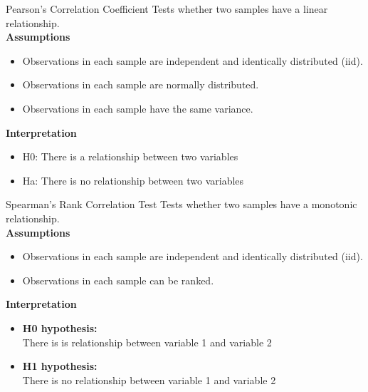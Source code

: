 \begin{frame}[t]{Pearson’s Correlation Coefficient}
	Tests whether two samples have a linear relationship. \\
	\textbf{Assumptions}
	\begin{itemize}
		\item Observations in each sample are independent and identically distributed (iid).
		\item Observations in each sample are normally distributed.
		\item Observations in each sample have the same variance.
	\end{itemize}

	\textbf{Interpretation}
\begin{itemize}
	\item H0: There is a relationship between two variables
	\item Ha: There is no relationship between two variables
\end{itemize}
\end{frame}

\begin{frame}[t]{Spearman’s Rank Correlation Test}
	Tests whether two samples have a monotonic relationship. \\
	\textbf{Assumptions}
	\begin{itemize}
		\item Observations in each sample are independent and identically distributed (iid).
		\item Observations in each sample can be ranked.
	\end{itemize}
	
	\textbf{Interpretation}
	\begin{itemize}
		\item \textbf{H0 hypothesis:} \\ There is is relationship between variable 1 and variable 2
		\item \textbf{H1 hypothesis:} \\ There is no relationship between variable 1 and variable 2
	\end{itemize}
\end{frame}

